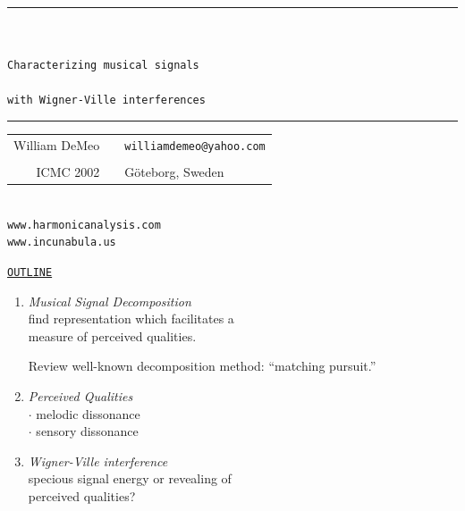 \documentclass{slides}
\newcommand{\HRule}{\rule{\linewidth}{.05mm}}
\begin{document}
\HRule\\\\
{\Large {\tt Characterizing musical signals}}\\\\
{\Large {\tt with Wigner-Ville interferences}}\\
\HRule
\begin{center}
\begin{tabular}{rcl}
William DeMeo &\hspace{2cm}& {\tt williamdemeo@yahoo.com}\\
\\
{\small ICMC 2002}&\hspace{2cm}& {\small G\"{o}teborg, Sweden}
\end{tabular}\\
\vspace{4cm}
{\tt www.harmonicanalysis.com}\\
{\tt www.incunabula.us}
\end{center}

\begin{slide}
\begin{center}{\tt \underline{OUTLINE}}\end{center}
\begin{enumerate}
\item 
{\it Musical Signal Decomposition}\\
find representation which facilitates a\\
measure of perceived qualities.

Review well-known decomposition 
method: ``matching pursuit.''

\item 
{\it Perceived Qualities}\\
$\cdot$ melodic dissonance\\
$\cdot$ sensory dissonance 
\item 
{\it Wigner-Ville interference}\\
specious signal energy or
revealing of \\ 
perceived qualities?

\end{enumerate}
\end{slide}
\end{document}
